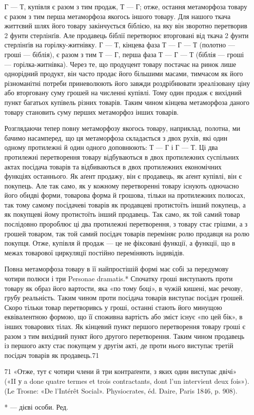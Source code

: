 Г — Т, купівля є разом з тим продаж, Т — Г; отже, остання
метаморфоза товару є разом з тим перша метаморфоза якогось
іншого товару. Для нашого ткача життєвий шлях його товару
закінчується біблією, на яку він зворотно перетворив 2 фунти
стерлінґів. Але продавець біблії перетворює вторговані від ткача
2 фунти стерлінґів на горілку-житнівку. Г — Т, кінцева фаза
Т — Г — Т (полотно — гроші — біблія), є разом з тим Т — Г,
перша фаза Т — Г — Т (біблія — гроші — горілка-житнівка).
Через те, що продуцент товару постачає на ринок лише однорідний
продукт, він часто продає його більшими масами, тимчасом
як його різноманітні потреби приневолюють його завжди
роздрібнювати зреалізовану ціну або вторговану суму грошей
на численні купівлі. Тому один продаж є вихідний пункт багатьох
купівель різних товарів. Таким чином кінцева метаморфоза
даного товару становить суму перших метаморфоз інших товарів.

Розглядаючи тепер повну метаморфозу якогось товару, наприклад,
полотна, ми бачимо насамперед, що ця метаморфоза
складається з двох рухів, які один одному протилежні й один
одного доповнюють: Т — Г і Г — Т. Ці два протилежні перетворення
товару відбуваються в двох протилежних суспільних
актах посідача товарів та відбиваються в двох протилежних
економічних функціях останнього. Як аґент продажу, він є продавець,
як аґент купівлі, він є покупець. Але так само, як у
кожному перетворенні товару існують одночасно його обидві
форми, товарова форма й грошова, тільки на протилежних полюсах,
так тому самому посідачеві товарів як продавцеві протистоїть
інший покупець, а як покупцеві йому протистоїть інший продавець.
Так само, як той самий товар послідовно пророблює ці два протилежні
перетворення, з товару стає грішми, а з грошей товаром, так
той самий посідач товарів переміняє ролю продавця на ролю покупця.
Отже, купівля й продаж — це не фіксовані функції, а функції,
що в межах товарової циркуляції постійно переміняють індивідів.

Повна метаморфоза товару в її найпростішій формі має собі
за передумову чотири полюси і три Personae dramatis.* Спочатку
гроші виступають проти товару як образ його вартости, яка
«по тому боці», в чужій кишені, має речову, грубу реальність.
Таким чином проти посідача товарів виступає посідач грошей.
Скоро тільки товар перетворивсь у гроші, останні стають його
минущою еквівалентною формою, що її споживна вартість або
зміст існує «по цей бік», в інших товарових тілах. Як кінцевий
пункт першого перетворення товару гроші є разом з тим вихідний
пункт його другого перетворення. Таким чином продавець
із першого акту стає покупцем у другім акті, де проти нього
виступає третій посідач товарів як продавець.71

71 «Отже, тут є чотири члени й три контраґенти, з яких один виступає
двічі» («II у a done quatre termes et trois contractants, dont l’un intervient
deux fois»). (Le Trosne: «De l’Intérêt Social». Physiocrates, éd. Daire,
Paris 1846, p. 908).

* — дієві особи. Ред.
